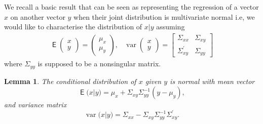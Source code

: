 \documentclass{article}
\newtheorem{lemma}[theorem]{Lemma}
\DeclareMathOperator{\var}{var}
\DeclareMathOperator{\E}{\mathsf{E}}
\begin{document}
We recall a basic result that can be seen as representing the regression of a vector $x$ on
another vector $y$ when their joint distribution is multivariate normal i.e, we would like to
characterise the distribution of $x|y$ assuming
\begin{equation}
  \begin{array}{rcl}
    \E \begin{pmatrix} x \\ y \end{pmatrix} = \begin{pmatrix} \mu_x \\ \mu_y \end{pmatrix}, &
    \var \begin{pmatrix} x \\ y \end{pmatrix} =
    \begin{bmatrix} \Sigma_{xx} & \Sigma_{xy} \\
      \Sigma_{xy}^\prime &  \Sigma_{yy}
      \end{bmatrix}
  \end{array}
\end{equation}
where $\Sigma_{yy}$ is supposed to be a nonsingular matrix.
\begin{lemma}
  The conditional distribution of $x$ given $y$ is normal with mean vector
  \begin{equation*}
    \E \big (  x |y \big ) = \mu_x + \Sigma_{xy} \Sigma_{yy}^{-1} (y-\mu_y)
    ,
  \end{equation*}
  and variance matrix
  \begin{equation*}
    \var \big (  x |y \big ) =  \Sigma_{xx}- \Sigma_{xy}\Sigma_{yy}^{-1} \Sigma_{xy}^\prime
    .
  \end{equation*}
\end{lemma}
\end{document}
